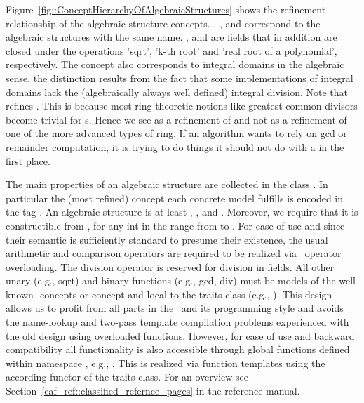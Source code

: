 Figure~\ref{fig::ConceptHierarchyOfAlgebraicStructures} shows the refinement 
relationship of the algebraic structure concepts. 
, ,   and 
 correspond to the algebraic structures with the
same name. ,  and 
 are fields that in addition are closed under 
the operations 'sqrt', 'k-th root' and 'real root of a polynomial', 
respectively. The concept  also
corresponds to integral domains in the algebraic sense, the
distinction results from the fact that some implementations of
integral domains lack the (algebraically always well defined) integral 
division.
Note that  refines . This is because 
most ring-theoretic notions like greatest common divisors become trivial for 
s. Hence we see  as a refinement of 
 and not as a 
refinement of one of the more advanced types of ring. 
If an algorithm wants to rely on gcd or remainder computation, it is trying 
to do things it should not do with a  in the first place. 


The main properties of an algebraic structure are collected in the class   
. 
In particular the (most refined) concept each concrete model  
fulfills is encoded in the tag 
.
An algebraic structure is at least , 
,  and 
. Moreover, we require that it is
constructible from , for any int in the range from  to . 
For ease of use and since their semantic is sufficiently standard to presume 
their existence, the usual arithmetic and comparison operators are required
to be realized via \CC\ operator overloading. 
The division operator is reserved for division in fields.  
All other unary (e.g., sqrt) and binary functions 
(e.g., gcd, div) must be models of the well known \stl-concepts
 or 
concept and local to the traits class 
(e.g., ). 
This design allows us to profit from all parts in the 
\stl\ and its programming style and avoids the name-lookup and 
two-pass template compilation problems experienced with the old design 
using overloaded functions. However, for ease of use and backward 
compatibility all functionality is also 
accessible through global functions defined within namespace , 
e.g., . This is realized via function templates using 
the according functor of the traits class. For an overview see 
Section~\ref{caf_ref::classified_refernce_pages} in the reference manual.

